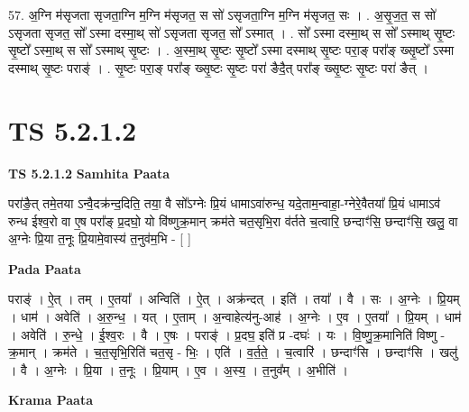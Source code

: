 \documentclass[17pt]{extarticle}
\begin{document}
57. अ॒ग्नि म॑सृजता सृजता॒ग्नि म॒ग्नि म॑सृजत॒ स सो॑ ऽसृजता॒ग्नि म॒ग्नि म॑सृजत॒ सः । . अ॒सृ॒ज॒त॒ स सो॑ ऽसृजता सृजत॒ सो᳚ ऽस्मा दस्मा॒थ् सो॑ ऽसृजता सृजत॒ सो᳚ ऽस्मात् । . सो᳚ ऽस्मा दस्मा॒थ् स सो᳚ ऽस्माथ् सृ॒ष्टः सृ॒ष्टो᳚ ऽस्मा॒थ् स सो᳚ ऽस्माथ् सृ॒ष्टः । . अ॒स्मा॒थ् सृ॒ष्टः सृ॒ष्टो᳚ ऽस्मा दस्माथ् सृ॒ष्टः परा॒ङ् परा᳚ङ् ख्सृ॒ष्टो᳚ ऽस्मा दस्माथ् सृ॒ष्टः पराङ्॑ । . सृ॒ष्टः परा॒ङ् परा᳚ङ् ख्सृ॒ष्टः सृ॒ष्टः परा॑ ङैदै॒त् परा᳚ङ् ख्सृ॒ष्टः सृ॒ष्टः परा॑ ङैत् । \newline
\pagebreak
{}

\section{ TS 5.2.1.2 }

\textbf{TS 5.2.1.2 } \newline
\textbf{Samhita Paata} \newline

परा॑ङै॒त् तमे॒तया ऽन्वै॒दक्र॑न्द॒दिति॒ तया॒ वै सो᳚ऽग्नेः प्रि॒यं धामाऽवा॑रुन्ध॒ यदे॒ताम॒न्वाहा॒-ग्नेरे॒वैतया᳚ प्रि॒यं धामाऽव॑ रुन्ध ईश्व॒रो वा ए॒ष परा᳚ङ् प्र॒दघो॒ यो वि॑ष्णुक्र॒मान् क्रम॑ते चत॒सृभि॒रा व॑र्तते च॒त्वारि॒ छन्दाꣳ॑सि॒ छन्दाꣳ॑सि॒ खलु॒ वा अ॒ग्नेः प्रि॒या त॒नूः प्रि॒यामे॒वास्य॑ त॒नुव॑म॒भि - [  ] \newline

\textbf{Pada Paata} \newline

पराङ्॑ । ऐ॒त् । तम् । ए॒तया᳚ । अन्विति॑ । ऐ॒त् । अक्र॑न्दत् । इति॑ । तया᳚ । वै । सः । अ॒ग्नेः । प्रि॒यम् । धाम॑ । अवेति॑ । अ॒रु॒न्ध॒ । यत् । ए॒ताम् । अ॒न्वाहेत्य॑नु-आह॑ । अ॒ग्नेः । ए॒व । ए॒तया᳚ । प्रि॒यम् । धाम॑ । अवेति॑ । रु॒न्धे॒ । ई॒श्व॒रः । वै । ए॒षः । पराङ्॑ । प्र॒दघ॒ इति॑ प्र -दघः॑ । यः । वि॒ष्णु॒क्र॒मानिति॑ विष्णु - क्र॒मान् । क्रम॑ते । च॒त॒सृभि॒रिति॑ चत॒सृ - भिः॒ । एति॑ । व॒र्त॒ते॒ । च॒त्वारि॑ । छन्दाꣳ॑सि । छन्दाꣳ॑सि । खलु॑ । वै । अ॒ग्नेः । प्रि॒या । त॒नूः । प्रि॒याम् । ए॒व । अ॒स्य॒ । त॒नुव᳚म् । अ॒भीति॑ ।  \newline


\textbf{Krama Paata} \newline
\end{document}
